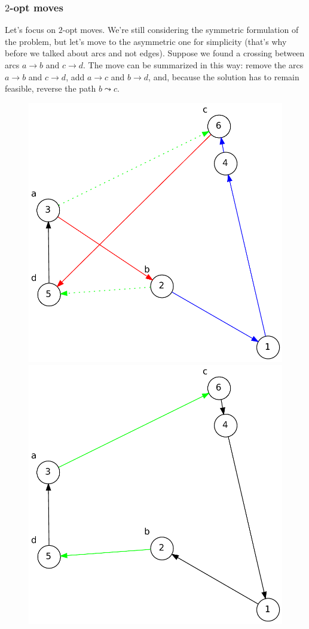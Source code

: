 \subsubsection{$2$-opt moves}
Let's focus on $2$-opt moves. We're still considering the symmetric formulation of
the problem, but let's move to the asymmetric one for simplicity (that's why
before we talked about arcs and not edges). Suppose we found a crossing between
arcs $a \rightarrow b$ and $c \rightarrow d$. The move can be summarized in this
way: remove the arcs $a \rightarrow b$ and $c \rightarrow d$, add $a \rightarrow
c$ and $b \rightarrow d$, and, because the solution has to remain feasible,
reverse the path $b \leadsto c$.

\begin{figure}[h]
    \centering
    \begin{minipage}{.45\textwidth}
        \centering
        \includegraphics[width=0.8\linewidth]{figures/2move_before.pdf}
    \end{minipage}%
    \begin{minipage}{.45\textwidth}
        \centering
        \includegraphics[width=0.8\linewidth]{figures/2move_after.pdf}

\end{minipage}
\end{figure}
